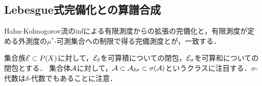 \documentclass[uplatex, dvipdfmx]{jsreport}
\begin{document}
\subsection{Lebesgue式完備化との算譜合成}

\begin{tcolorbox}[colframe=ForestGreen, colback=ForestGreen!10!white,breakable,colbacktitle=ForestGreen!40!white,coltitle=black,fonttitle=\bfseries\sffamily,
title=]
    Hahn-Kolmogorov流のinfによる有限測度からの拡張の完備化と，有限測度が定める外測度の$\mu^*$-可測集合への制限で得る完備測度とが，一致する．
\end{tcolorbox}

\begin{notation}
    集合族$\mathcal{E}\subset P(X)$に対して，$\mathcal{E}_\delta$を可算積についての閉包，$\mathcal{E}_\sigma$を可算和についての閉包とする．
    集合体$\mathcal{A}$に対して，$\mathcal{A}\subset\mathcal{A}_{\delta\sigma}\subset\sigma(\mathcal{A})$というクラスに注目する．$\sigma$-代数は$\delta$-代数でもあることに注意．
\end{notation}
\end{document}
